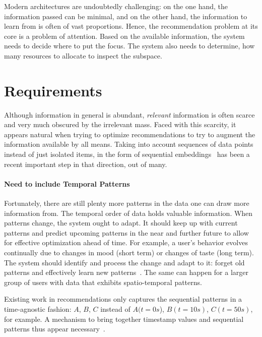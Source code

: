 Modern architectures are undoubtedly challenging: on the one hand, the information passed can be minimal, and on the other hand, the information to learn from is often of vast proportions. Hence, the recommendation problem at its core is a problem of attention. Based on the available information, the system needs to decide where to put the focus. The system also needs to determine, how many resources to allocate to inspect the subspace.


\section{Requirements}

Although information in general is abundant, \emph{relevant} information is often scarce and very much obscured by the irrelevant mass. Faced with this scarcity, it appears natural when trying to optimize recommendations to try to augment the information available by all means. Taking into account sequences of data points instead of just isolated items, in the form of sequential embeddings~\cite{Githubbert4rec, tang2018personalized, rendlefactorizing} has been a recent important step in that direction, out of many.

\paragraph{Need to include Temporal Patterns}
%
Fortunately, there are still plenty more patterns in the data one can draw more information from. The temporal order of data holds valuable information. When patterns change, the system ought to adapt. It should keep up with current patterns and predict upcoming patterns in the near and further future to allow for effective optimization ahead of time. For example, a user's behavior evolves continually due to changes in mood (short term) or changes of taste (long term). The system should identify and process the change and adapt to it: forget old patterns and effectively learn new patterns~\cite{tsymbal2004problem}. The same can happen for a larger group of users with data that exhibits spatio-temporal patterns.

Existing work in recommendations only captures the sequential patterns in a time-agnostic fashion: $ A $, $ B $, $ C $ instead of $ A(t=0s $), $ B(t=10s) $, $ C(t=50s) $, for example. A mechanism to bring together timestamp values and sequential patterns thus appear necessary~\cite{wang2019survey, wang2019sequential}.

